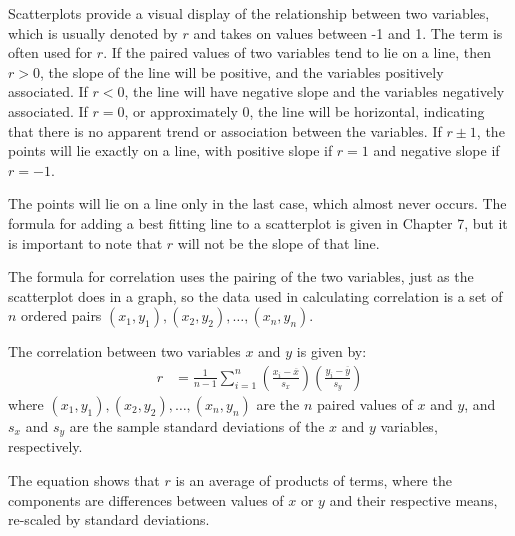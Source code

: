 
Scatterplots provide a visual display of the relationship between two variables, which is usually denoted by $r$ and takes on values between -1 and 1.  The term  is often used for $r$. If the paired values of two variables tend to lie on a line, then $r > 0$, the slope of the line will be positive, and the variables positively associated.
If $r < 0$, the line will have negative slope and the variables negatively associated.
If $r = 0$, or approximately 0, the line will be horizontal, indicating that there is no apparent trend or association between the variables.
If $r \pm 1$, the points will lie exactly on a line, with positive slope if $r = 1$ and negative slope if $r = -1$.

The points will lie on a line only in the last case, which almost never occurs.  The formula for adding a best fitting line to a scatterplot is given in Chapter 7, but it is important to note that $r$ will not be the slope of that line.

The formula for correlation uses the pairing of the two variables, just as the scatterplot does in a graph, so the data used in calculating correlation is a set of $n$ ordered pairs $(x_1,y_1), (x_2,y_2), \ldots, (x_n, y_n) $.

\begin{termBox}{%
		The correlation between two variables $x$ and $y$ is given by:
		\begin{align*}
          r &=  \frac{1}{n-1}\sum^{n}_{i=1}
          \left(\frac{x_{i}-\overline{x}}
          {s_{x}}\right)\left(\frac{y_{i}-\overline{y}}{s_{y}}\right)
 		\label{correlationEquation}
 		\end{align*}
        where $(x_1,y_1), (x_2,y_2), \ldots, (x_n, y_n)$ are the $n$ paired values of $x$ and $y$, and $s_x$ and $s_y$ are the sample standard deviations of the $x$ and $y$
        variables, respectively.}
\end{termBox}

The equation shows that $r$ is an average of products of terms, where the components are differences between values of $x$ or $y$ and their respective means, re-scaled by standard deviations. 

